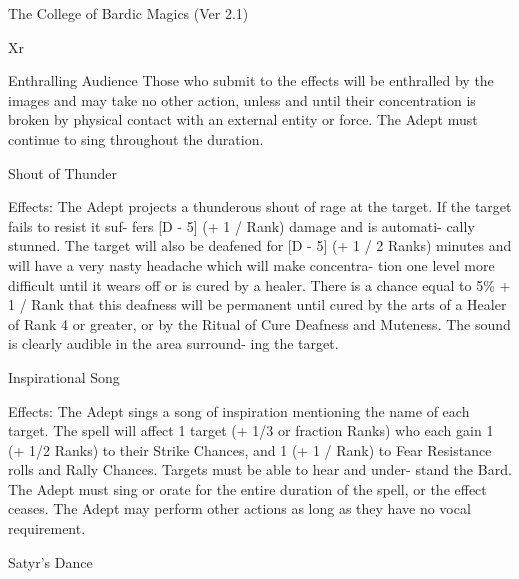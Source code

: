 \begin{Chapter}{The College of Bardic Magics (Ver 2.1)}
\begin{tarularx}{\columnwidth}{Xr}
\begin{spell}[S-6]{Enthralling Audience }
Those  who submit to the effects will be enthralled 
by the images and may take no other action, unless 
and until their concentration is broken by physical 
contact with an external entity or force. The Adept 
must continue to sing throughout the duration. 
\end{spell}

\begin{spell}[S-7]{Shout of Thunder }

Effects:  The  Adept  projects  a  thunderous  shout  of 
rage at the target. If the target fails to resist it suf-
fers  [D  -  5]  (+  1 / Rank) damage  and  is automati-
cally stunned. The target will also be deafened for 
[D  -  5]  (+  1  /  2  Ranks)  minutes  and  will  have  a 
very  nasty  headache  which  will  make  concentra-
tion one level more difficult until it wears off or is 
cured by a healer. There is a chance equal to 5\% + 
1 / Rank that this deafness will be permanent until 
cured by the arts of a Healer of Rank 4 or greater, 
or  by  the  Ritual  of  Cure  Deafness  and  Muteness. 
The  sound  is  clearly  audible  in  the  area  surround-
ing the target. 
\end{spell}

\begin{spell}[S-8]{Inspirational Song }

Effects:  The  Adept  sings  a  song  of  inspiration 
mentioning the name of each target. The spell will 
affect  1  target  (+  1/3  or  fraction  Ranks)  who  each 
gain 1 (+ 1/2 Ranks) to their Strike Chances, and 1 
(+  1  /  Rank)  to  Fear  Resistance  rolls  and  Rally 
Chances.  Targets  must  be  able  to  hear  and  under-
stand  the  Bard.  The  Adept  must  sing  or  orate  for 
the entire duration of the spell, or the effect ceases. 
The  Adept  may  perform  other  actions  as  long  as 
they have no vocal requirement. 
\end{spell}

\begin{spell}[S-9]{Satyr’s Dance}


\end{spell}
\end{tarularx}
\end{Chapter}
